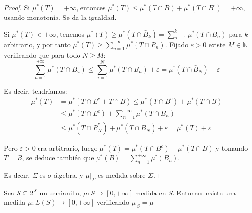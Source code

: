 \begin{proof}
   Si $\mu^\ast(T) = +\infty$, entonces $\mu^\ast(T) \le \mu^\ast(T\cap B ) + \mu^\ast(T\cap B^c) = +\infty$, usando 
   monotonía. Se da la igualdad.
   
   Si $\mu^\ast(T) < +\infty$, tenemos $\mu^\ast(T) \ge \mu^\ast(T\cap \bar{B}_k) = \sum_{n=1}^k \mu^\ast(T\cap B_n)$
   para $k$ arbitrario, y por tanto $\mu^\ast(T) \ge \sum_{n=1}^{+\infty} \mu^\ast(T\cap B_n)$. Fijado $\varepsilon > 0$
   existe $M\in \mathbb{N}$ verificando que para todo $N\ge M$:
   \[
     \sum_{n=1}^{+\infty} \mu^\ast(T\cap B_n) \le \sum_{n=1}^N \mu^\ast(T\cap B_n) + \varepsilon = 
     \mu^\ast(T\cap \bar{B}_N) + \varepsilon
   \]
   
   Es decir, tendríamos:
   \begin{align*}
    \mu^\ast(T) &=   \mu^\ast(T\cap B^c + T\cap B) \le \mu^\ast(T\cap B^c) + \mu^\ast(T\cap B)\\
                &\le \mu^\ast(T\cap B^c) + \sum_{n=1}^{+\infty}\mu^\ast(T\cap B_n)\\
                &\le \mu^\ast(T\cap \bar{B}_N^c) + \mu^\ast(T\cap \bar{B}_N) + \varepsilon
                  =  \mu^\ast(T) + \varepsilon
   \end{align*}
   
   Pero $\varepsilon > 0$ era arbitrario, luego $\mu^\ast(T) = \mu^\ast(T\cap B^c) + \mu^\ast(T\cap B)$ y tomando 
   $T=B$, se deduce también que $\mu^\ast(B) = \sum_{n=1}^{+\infty}\mu^\ast(B_n)$.
   
   Es decir, $\Sigma$ es $\sigma$-álgebra. y $\mu|_{\Sigma}$ es medida sobre $\Sigma$.
  \end{proof}


\begin{theorem}
 Sea $S \subseteq 2^X$ un semianillo, $\mu:S \rightarrow [0,+\infty]$ medida en $S$. Entonces existe
 una medida $\bar{\mu}:\Sigma(S) \rightarrow [0,+\infty]$ verificando $\bar{\mu}_{|S} = \mu$
 \label{th:caratheodory}
\end{theorem}

